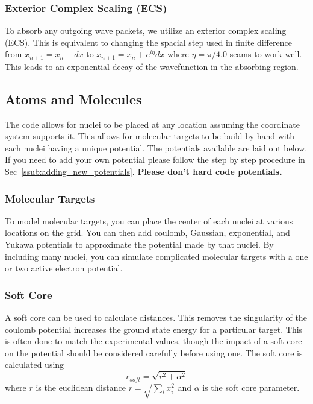 \documentclass{article}
\begin{document}
\subsubsection{Exterior Complex Scaling (ECS)} %
\label{ssub:exterer_complex_scaling}
To absorb any outgoing wave packets, we utilize an exterior complex scaling (ECS). This is equivalent to changing the spacial step used in finite difference from $x_{n+1} = x_n+dx$ to $x_{n+1} = x_n+e^{i\eta}dx$ where $\eta=\pi / 4.0$ seams to work well. This leads to an exponential decay of the wavefunction in the absorbing region.


\subsection{Atoms and Molecules} %
\label{sub:atoms_and_molecules}
The code allows for nuclei to be placed at any location assuming the coordinate system supports it. This allows for molecular targets to be build by hand with each nuclei having a unique potential. The potentials available are laid out below. If you need to add your own potential please follow the step by step procedure in Sec~\ref{ssub:adding_new_potentials}. \textbf{Please don't hard code potentials.}

\subsubsection{Molecular Targets} %
\label{ssub:molecular_targets}
To model molecular targets, you can place the center of each nuclei at various locations on the grid. You can then add coulomb, Gaussian, exponential, and Yukawa potentials to approximate the potential made by that nuclei. By including many nuclei, you can simulate complicated molecular targets with a one or two active electron potential.

\subsubsection{Soft Core} %
\label{ssub:soft_core_like}
A soft core can be used to calculate distances. This removes the singularity of the coulomb potential increases the ground state energy for a particular target. This is often done to match the experimental values, though the impact of a soft core on the potential should be considered carefully before using one. The soft core is calculated using
\begin{equation}
  r_{soft} = \sqrt{r^2 + \alpha^2}
  \label{eq:soft_core}
\end{equation}
where $r$ is the euclidean distance $r=\sqrt{\sum\limits_i x_i^2}$ and $\alpha$ is the soft core parameter.
\end{document}
